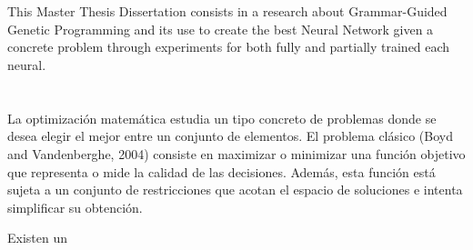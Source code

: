 \documentclass[spanish,a4paper,12pt,twoside]{report}
\begin{document}
  \chapter{\vspace{-3cm}{\LARGE Summary}}
  \vspace{-1cm}
  This Master Thesis Dissertation consists in a research about Grammar-Guided Genetic Programming and its use to create the best Neural Network given a concrete problem through experiments for both fully and partially trained each neural.
  \vfill
  \newpage\cleardoublepage
  
  \tableofcontents
  \vfill
  \newpage\cleardoublepage
  
  \chapter{\vspace{-3cm}{\LARGE 1. Introducción}}
  \vspace{-1cm}
  La optimización matemática estudia un tipo concreto de problemas donde se desea elegir el mejor entre un conjunto de elementos. El problema clásico (Boyd and Vandenberghe, 2004) consiste en maximizar o minimizar una función objetivo que representa o mide la calidad de las decisiones. Además, esta función está sujeta a un conjunto de restricciones que acotan el espacio de soluciones e intenta simplificar su obtención. \par
  Existen un
  
  \chapter{\vspace{-3cm}{\LARGE 2. Computación Evolutiva}}
  
  \chapter{\vspace{-3cm}{\LARGE 3. Redes de Neuronas Artificiales}}
  
  \chapter{\vspace{-3cm}{\LARGE 4. Construcción de Redes de Neuronas}}
  
  \chapter{\vspace{-3cm}{\LARGE 5. Planteamiento del problema}}
  
\end{document}
